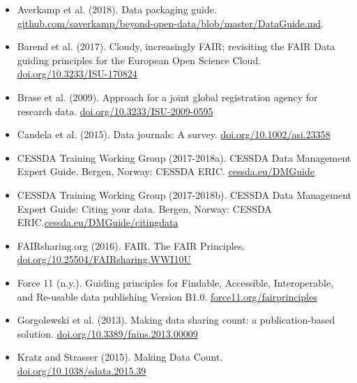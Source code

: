 \documentclass{article}
\begin{document}
\begin{itemize}
\item Averkamp et al. (2018). Data packaging guide. \href{https://github.com/saverkamp/beyond-open-data/blob/master/DataGuide.md}{github.com/saverkamp/beyond-open-data/blob/master/DataGuide.md}.


\item Barend et al. (2017). Cloudy, increasingly FAIR; revisiting the FAIR Data guiding principles for the European Open Science Cloud. \href{https://doi.org/10.3233/ISU-170824}{doi.org/10.3233/ISU-170824}


\item Brase et al. (2009). Approach for a joint global registration agency for research data. \href{https://doi.org/10.3233/ISU-2009-0595}{doi.org/10.3233/ISU-2009-0595}


\item Candela et al. (2015). Data journals: A survey. \href{https://doi.org/10.1002/asi.23358}{doi.org/10.1002/asi.23358}


\item CESSDA Training Working Group (2017-2018a). CESSDA Data Management Expert Guide. Bergen, Norway: CESSDA ERIC. \href{https://www.cessda.eu/Research-Infrastructure/Training/Expert-tour-guide-on-Data-Management}{cessda.eu/DMGuide}


\item CESSDA Training Working Group (2017-2018b). CESSDA Data Management Expert Guide: Citing your data. Bergen, Norway: CESSDA ERIC.\href{https://www.cessda.eu/Research-Infrastructure/Training/Expert-tour-guide-on-Data-Management/6.-Archive-Publish/Publishing-with-CESSDA-archives/Citing-your-data}{cessda.eu/DMGuide/citingdata}


\item FAIRsharing.org (2016). FAIR. The FAIR Principles. \href{https://doi.org/10.25504/FAIRsharing.WWI10U}{doi.org/10.25504/FAIRsharing.WWI10U}


\item Force 11 (n.y.). Guiding principles for Findable, Accessible, Interoperable, and Re-usable data publishing Version B1.0. \href{https://www.force11.org/fairprinciples}{force11.org/fairprinciples}


\item Gorgolewski et al. (2013). Making data sharing count: a publication-based solution. \href{https://doi.org/10.3389/fnins.2013.00009}{doi.org/10.3389/fnins.2013.00009}


\item Kratz and Strasser (2015). Making Data Count. \href{https://www.nature.com/articles/sdata201539}{doi.org/10.1038/sdata.2015.39}



\end{itemize}
\end{document}
